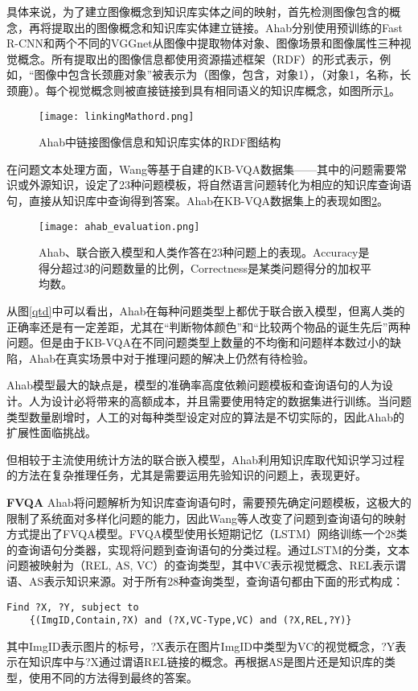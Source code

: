 具体来说，为了建立图像概念到知识库实体之间的映射，首先检测图像包含的概念，再将提取出的图像概念和知识库实体建立链接。Ahab分别使用预训练的Fast R-CNN和两个不同的VGGnet从图像中提取物体对象、图像场景和图像属性三种视觉概念。所有提取出的图像信息都使用资源描述框架（RDF）的形式表示，例如，“图像中包含长颈鹿对象”被表示为（图像，包含，对象1），（对象1，名称，长颈鹿）。每个视觉概念则被直接链接到具有相同语义的知识库概念，如图所示\ref{linkingMathord}。
\begin{figure}[H]
	\centering
	\texttt{[image: linkingMathord.png]}
	\caption{Ahab中链接图像信息和知识库实体的RDF图结构}
	\label{linkingMathord}
\end{figure}

在问题文本处理方面，Wang等基于自建的KB-VQA数据集——其中的问题需要常识或外源知识，设定了23种问题模板，将自然语言问题转化为相应的知识库查询语句，直接从知识库中查询得到答案。Ahab在KB-VQA数据集上的表现如图\ref{ahab_evaluation}。
\begin{figure}[H]
	\centering
	\texttt{[image: ahab\_evaluation.png]}
	\caption{Ahab、联合嵌入模型和人类作答在23种问题上的表现。Accuracy是得分超过3的问题数量的比例，Correctness是某类问题得分的加权平均数。}
	\label{ahab_evaluation}
\end{figure}

从图\ref{qtd}中可以看出，Ahab在每种问题类型上都优于联合嵌入模型，但离人类的正确率还是有一定差距，尤其在“判断物体颜色”和“比较两个物品的诞生先后”两种问题。但是由于KB-VQA在不同问题类型上数量的不均衡和问题样本数过小的缺陷，Ahab在真实场景中对于推理问题的解决上仍然有待检验。

Ahab模型最大的缺点是，模型的准确率高度依赖问题模板和查询语句的人为设计。人为设计必将带来的高额成本，并且需要使用特定的数据集进行训练。当问题类型数量剧增时，人工的对每种类型设定对应的算法是不切实际的，因此Ahab的扩展性面临挑战。

但相较于主流使用统计方法的联合嵌入模型，Ahab利用知识库取代知识学习过程的方法在复杂推理任务，尤其是需要运用先验知识的问题上，表现更好。

\textbf{FVQA}
Ahab将问题解析为知识库查询语句时，需要预先确定问题模板，这极大的限制了系统面对多样化问题的能力，因此Wang等人改变了问题到查询语句的映射方式提出了FVQA模型。FVQA模型使用长短期记忆（LSTM）网络训练一个28类的查询语句分类器，实现将问题到查询语句的分类过程。通过LSTM的分类，文本问题被映射为（REL, AS, VC）的查询类型，其中VC表示视觉概念、REL表示谓语、AS表示知识来源。对于所有28种查询类型，查询语句都由下面的形式构成：
\begin{verbatim}
Find ?X, ?Y, subject to 
	{(ImgID,Contain,?X) and (?X,VC-Type,VC) and (?X,REL,?Y)}
\end{verbatim}
其中ImgID表示图片的标号，?X表示在图片ImgID中类型为VC的视觉概念，?Y表示在知识库中与?X通过谓语REL链接的概念。再根据AS是图片还是知识库的类型，使用不同的方法得到最终的答案。

